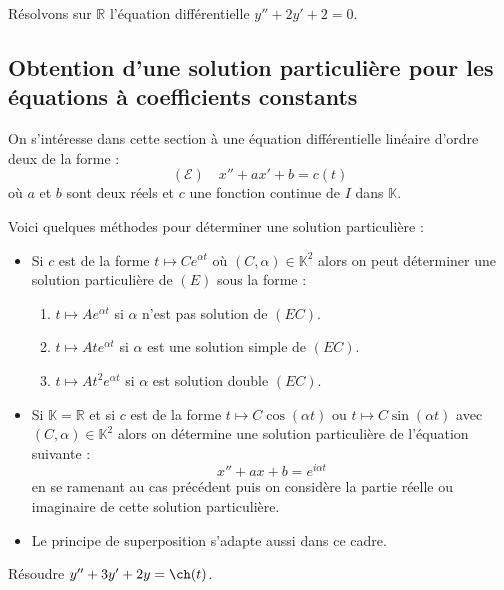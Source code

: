 \documentclass[a4paper,10pt]{report}
\begin{document}
\begin{ex} Résolvons sur $\mathbb{R}$ l'équation différentielle $y''+2y'+2=0$.

\vspace{4cm}
\end{ex}

\subsection{Obtention d'une solution particulière pour les équations à coefficients constants}
\noindent On s'intéresse dans cette section à une équation différentielle linéaire d'ordre deux de la forme :
$$ (\mathcal{E}) \quad x''+ax'+b=c(t)$$
où $a$ et $b$ sont deux réels et $c$ une fonction continue de $I$ dans $\mathbb{K}$.

\medskip

\noindent Voici quelques méthodes pour déterminer une solution particulière : 

\begin{itemize}
\item Si $c$ est de la forme $t \mapsto C e^{\alpha t}$ où $(C, \alpha) \in \mathbb{K}^2$ alors on peut déterminer une solution particulière de $(E)$ sous la forme :
\begin{enumerate}
\item $t \mapsto A e^{\alpha t}$ si $\alpha$ n'est pas solution de $(EC)$.
\item $t \mapsto At e^{\alpha t}$ si $\alpha$ est une solution \og simple \fg de $(EC)$.
\item $t \mapsto At^2 e^{\alpha t}$ si $\alpha$ est solution \og double \fg $(EC)$.
\end{enumerate}
\item Si $\mathbb{K}= \mathbb{R}$ et si $c$ est de la forme $t \mapsto C \cos(\alpha t)$ ou $t \mapsto C \sin(\alpha t)$ avec $(C, \alpha) \in \mathbb{K}^2$ alors on détermine une solution particulière de l'équation suivante :
$$ x''+ax+b= e^{i \alpha t}$$
en se ramenant au cas précédent puis on considère la partie réelle ou imaginaire de cette solution particulière.
\item Le principe de superposition s'adapte aussi dans ce cadre.
\end{itemize}

\begin{ex} Résoudre $y'' + 3y' + 2y = \ch(t)$.

\vspace{10cm}
\end{ex}
\end{document}
